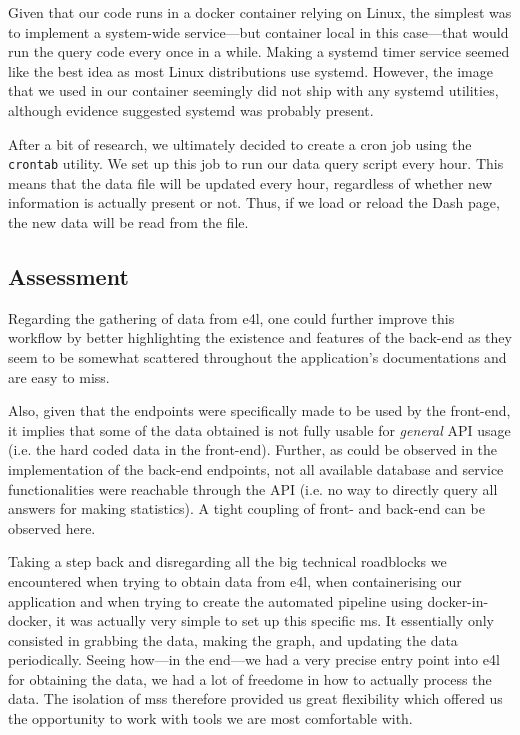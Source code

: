 Given that our code runs in a docker container relying on Linux, the
simplest was to implement a system-wide service---but container local
in this case---that would run the query code every once in a while.
Making a systemd timer service seemed like the best idea as most Linux
distributions use systemd. However, the image that we used in our
container seemingly did not ship with any systemd utilities, although
evidence suggested systemd was probably present.

After a bit of research, we ultimately decided to create a cron job
using the \verb|crontab| utility. We set up this job to run our data
query script every hour. This means that the data file will be updated
every hour, regardless of whether new information is actually present
or not. Thus, if we load or reload the Dash page, the new data will be
read from the file.

\subsection{Assessment}

Regarding the gathering of data from \gls{e4l}, one could further
improve this workflow by better highlighting the existence and
features of the back-end as they seem to be somewhat scattered
throughout the application's documentations and are easy to miss.

Also, given that the endpoints were specifically made to be used by
the front-end, it implies that some of the data obtained is not fully
usable for \textit{general} API usage (i.e. the hard coded data in the
front-end). Further, as could be observed in the implementation of the
back-end endpoints, not all available database and service
functionalities were reachable through the API (i.e. no way to
directly query all answers for making statistics). A tight coupling of
front- and back-end can be observed here.

Taking a step back and disregarding all the big technical roadblocks
we encountered when trying to obtain data from \gls{e4l}, when
containerising our application and when trying to create the automated
pipeline using docker-in-docker, it was actually very simple to set up
this specific \gls{ms}. It essentially only consisted in grabbing the
data, making the graph, and updating the data periodically. Seeing
how---in the end---we had a very precise entry point into \gls{e4l}
for obtaining the data, we had a lot of freedome in how to actually
process the data. The isolation of \glspl{ms} therefore provided us
great flexibility which offered us the opportunity to work with tools
we are most comfortable with.

